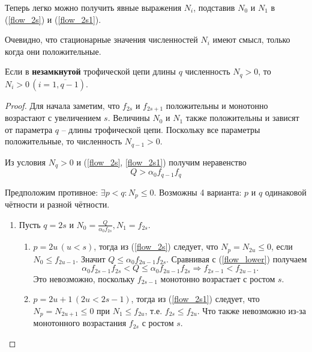     Теперь легко можно получить явные выражения \(N_i\), подставив \(N_0\) и \( N_1\) в (\ref{flow_2s}) и (\ref{flow_2s1}).

    Очевидно, что стационарные значения численностей \(N_i\) имеют смысл, только когда они положительные.

    \begin{statement}
        Если в \textbf{незамкнутой} трофической цепи длины \(q\) численность \(N_q > 0\), то \(N_i > 0 \, (i=\overline{1,q-1})\).
    \end{statement}

    \begin{proof}
        Для начала заметим, что \(f_{2s}\) и \(f_{2s+1}\) положительны и монотонно возрастают с увеличением \(s\). Величины \(N_0\) и \(N_1\) также положительны и зависят от параметра \(q\) -- длины трофической цепи.  
        Поскольку все параметры положительные, то численность \( N_{q-1} > 0 \).

        Из условия \( N_q > 0 \) и (\ref{flow_2s}, \ref{flow_2s1}) получим неравенство
        \begin{equation} \label{flow_lower}
            Q > \alpha_0 f_{q-1} f_{q}
        \end{equation} 

        Предположим противное: \(\exists p < q : N_p \leq 0\). Возможны 4 варианта: \(p\) и \(q\) одинаковой чётности и разной чётности.

        \begin{enumerate}
            \item Пусть \(q = 2s \) и \( N_0 = \frac{Q}{\alpha_0 f_{2s}}, N_1 = f_{2s}\).
            \begin{enumerate}
                \item \(p = 2u \, (u < s)\), тогда из (\ref{flow_2s}) следует, что \( N_p = N_{2u} \leq 0 \), если \(N_0 \leq f_{2u-1}\). Значит \(Q \leq \alpha_0 f_{2u-1} f_{2s} \). Сравнивая с (\ref{flow_lower}) получаем
                \begin{equation*}
                    \alpha_0 f_{2s-1} f_{2s} < Q \leq \alpha_0 f_{2u-1} f_{2s} \Rightarrow f_{2s-1} < f_{2u-1}.
                \end{equation*}
                Это невозможно, поскольку \(f_{2s-1}\) монотонно возрастает с ростом \(s\).

                \item \(p = 2u+1 \, (2u < 2s-1)\), тогда из (\ref{flow_2s1}) следует, что \( N_p = N_{2u+1} \leq 0 \) при \(N_1 \leq f_{2u}\), т.е. \(f_{2s} \leq f_{2u} \). Что также невозможно из-за монотонного возрастания \(f_{2s}\) с ростом \(s\). 
            \end{enumerate}


\end{enumerate}
\end{proof}
